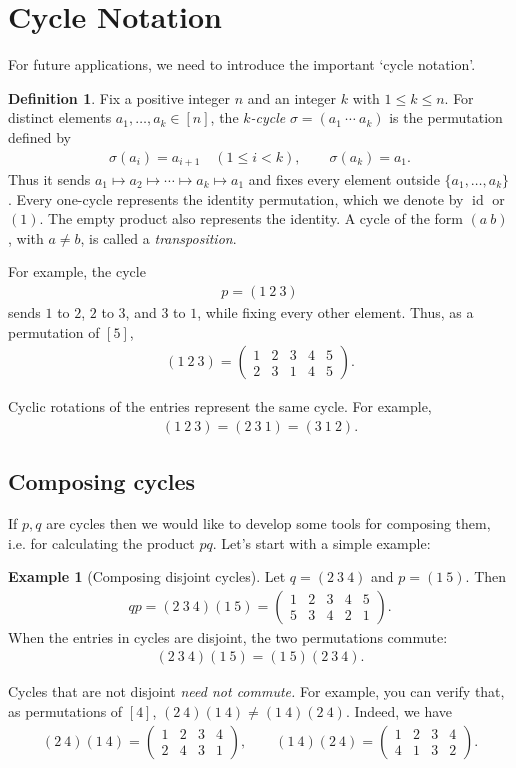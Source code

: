 \documentclass[reqno,11pt]{amsart}
\theoremstyle{definition}
\newtheorem{definition}{Definition}[section]
\newtheorem{example}{Example}[section]
\theoremstyle{plain}
\theoremstyle{remark}
\numberwithin{equation}{section}
\newcommand{\id}{\operatorname{id}}
\newcommand{\be}{\begin{eqnarray}}
\newcommand{\ee}{\end{eqnarray}}
\begin{document}
\newpage
\section{Cycle Notation}
For future applications, we need to introduce the important `cycle notation'. 

\begin{definition}
Fix a positive integer $n$ and an integer $k$ with $1\leq k\leq n$.
For distinct elements $a_1,\ldots,a_k\in[n]$, the \emph{$k$-cycle}
$\sigma=(a_1\ \cdots\ a_k)$ is the permutation defined by
\be
\sigma(a_i)=a_{i+1}\quad(1\leq i<k),\qquad \sigma(a_k)=a_1.
\ee
Thus it sends $a_1\mapsto a_2\mapsto\cdots\mapsto a_k\mapsto a_1$
and fixes every element outside $\{a_1,\ldots,a_k\}$.
Every one-cycle represents the identity permutation, which we denote by
$\id$ or $(1)$. The empty product also represents the identity.
A cycle of the form $(a\ b)$, with $a\neq b$, is called a \emph{transposition}.
\end{definition}


For example, the cycle
\be
p=(1\ 2\ 3)
\ee
sends $1$ to $2$, $2$ to $3$, and $3$ to $1$, while fixing every other
element. Thus, as a permutation of $[5]$,
\be
(1\ 2\ 3)=
\begin{pmatrix}
1&2&3&4&5\\
2&3&1&4&5
\end{pmatrix}.
\ee

	Cyclic rotations of the entries represent the same cycle. For example,
	\be
	(1\ 2\ 3)=(2\ 3\ 1)=(3\ 1\ 2).
	\ee

\subsection*{Composing cycles} 

If $p, q$ are cycles then we would like to develop some tools for composing them, i.e. for calculating the product $pq$.  Let's start with a simple example: 

\begin{example}[Composing disjoint cycles]
Let $q=(2\ 3\ 4)$ and $p=(1\ 5)$. Then
\be
qp=(2\ 3\ 4)(1\ 5)
=
\begin{pmatrix}
1&2&3&4&5\\
5&3&4&2&1
\end{pmatrix}.
\ee
When the entries in cycles are disjoint, the two permutations commute:
\be
(2\ 3\ 4)(1\ 5)=(1\ 5)(2\ 3\ 4).
\ee

Cycles that are not disjoint \textit{need not commute.} For example,
you can verify that, as permutations of $[4]$,
$(2\ 4)(1\ 4)\neq(1\ 4)(2\ 4)$. Indeed, we have
\be
(2\ 4)(1\ 4) = \begin{pmatrix}
	1&2&3&4\\
	2&4&3&1
\end{pmatrix}, \qquad
(1\ 4)(2\ 4) = \begin{pmatrix}
	1&2&3&4\\
	4&1&3&2
\end{pmatrix}.
\ee

\end{example}
\end{document}
